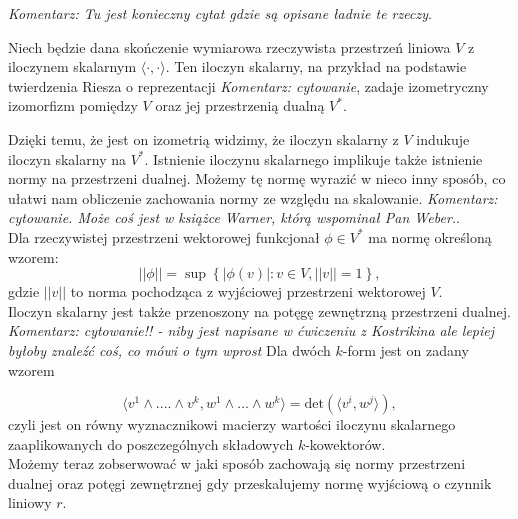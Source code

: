 \documentclass[licencjacka]{pracamgr}
\theoremstyle{definition}
\theoremstyle{definition}
\theoremstyle{plain}
\theoremstyle{plain}
\theoremstyle{plain}
\theoremstyle{plain}
\begin{document}
\emph{Komentarz: Tu jest konieczny cytat gdzie są opisane ładnie te rzeczy}.

Niech będzie dana skończenie wymiarowa rzeczywista przestrzeń liniowa $V$ z
iloczynem skalarnym $\langle \cdot, \cdot \rangle$.
Ten iloczyn skalarny, na przykład na podstawie twierdzenia Riesza o
reprezentacji \emph{Komentarz: cytowanie}, zadaje izometryczny izomorfizm
pomiędzy $V$ oraz jej przestrzenią dualną $V^\ast$.

Dzięki temu, że jest on izometrią widzimy, że iloczyn skalarny z $V$
indukuje iloczyn skalarny na $V^\ast$.  Istnienie iloczynu skalarnego
implikuje także istnienie normy na przestrzeni dualnej. Możemy tę
normę wyrazić w nieco inny sposób, co ułatwi nam obliczenie zachowania
normy ze względu na skalowanie.  \emph{Komentarz: cytowanie. Może coś
  jest w książce Warner, którą wspominał Pan Weber.}. \\

Dla rzeczywistej przestrzeni wektorowej funkcjonał $\phi \in V^\ast$ ma
normę określoną wzorem:
\begin{equation}\label{norm-of-functional}
||\phi|| = \sup \left\{ |\phi(v)|: v \in V, ||v|| = 1 \right\},
\end{equation}
gdzie $||v||$ to norma pochodząca z wyjściowej przestrzeni wektorowej $V$.  \\


Iloczyn skalarny jest także przenoszony na potęgę zewnętrzną przestrzeni
dualnej. \emph{Komentarz: cytowanie!! - niby jest napisane w ćwiczeniu z
Kostrikina ale lepiej byłoby znaleźć coś, co mówi o tym wprost} Dla dwóch
$k$-form jest on zadany wzorem

\begin{equation} \langle v^1 \wedge ....\wedge v^k, w^1 \wedge ... \wedge w^k
\rangle = \text{det} \left( \langle v^i, w^j \rangle \right), 
\end{equation}
czyli jest on równy wyznacznikowi macierzy wartości iloczynu skalarnego
zaaplikowanych do poszczególnych składowych $k$-kowektorów.  \\

Możemy teraz zobserwować w jaki sposób zachowają się normy 
przestrzeni dualnej oraz potęgi zewnętrznej gdy przeskalujemy normę wyjściową
o czynnik liniowy $r$. \\
\end{document}
